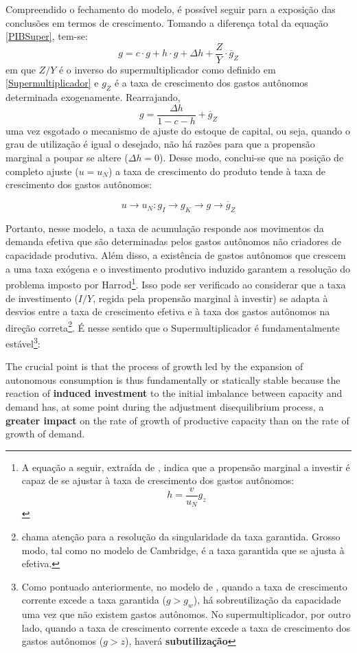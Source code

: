 Compreendido o fechamento do modelo, é possível seguir para a exposição das conclusões em termos de crescimento. Tomando a diferença total da equação \ref{PIBSuper}, tem-se:
$$
g = c\cdot g + h\cdot g + \Delta h + \frac{Z}{Y}\cdot \overline g_Z
$$
em que $Z/Y$ é o inverso do supermultiplicador como definido em \ref{Supermultiplicador} e $g_Z$ é a taxa de crescimento dos gastos autônomos determinada exogenamente. Rearrajando, 
\begin{equation}
\label{crescimentosuper}
g = \frac{\Delta h}{1 - c - h} + \overline g_Z
\end{equation}
uma vez esgotado o mecanismo de ajuste do estoque de capital, ou seja, quando o grau de utilização é igual o desejado, não há razões para que a propensão marginal a poupar se altere ($\Delta h = 0$). Desse modo, conclui-se que na posição de completo ajuste ($u = u_N$) a taxa de crescimento do produto tende à taxa de crescimento dos gastos autônomos:

$$
u \to u_N : g_I \to g_K \to g \to \overline g_Z
$$

Portanto, nesse modelo, a taxa de acumulação responde aos movimentos da demanda efetiva que são determinadas pelos gastos autônomos não criadores de capacidade produtiva. Além disso, a existência de gastos autônomos que crescem a uma taxa exógena e o investimento produtivo induzido garantem a resolução do problema imposto por Harrod\footnote{A equação a seguir, extraída de \textcite{serrano_sraffian_2017}, indica que a propensão marginal a investir é capaz de se ajustar à taxa de crescimento dos gastos autônomos:
$$
h = \frac{v}{u_N}g_z
$$
}. Isso pode ser verificado ao considerar que a taxa de investimento ($I/Y$, regida pela propensão marginal à investir) se adapta à desvios entre a taxa de crescimento efetiva e à taxa dos gastos autônomos na direção correta\footnote{\textcite{cesaratto_neo-kaleckian_2015} chama atenção para a resolução da singularidade da taxa garantida. Grosso modo, tal como no modelo de Cambridge, é a taxa garantida que se ajusta à efetiva.}. 
É nesse sentido que o Supermultiplicador é fundamentalmente estável\footnote{
Como pontuado anteriormente, no modelo de \textcite{harrod_essay_1939}, quando a taxa de crescimento corrente excede a taxa garantida ($g > g_w$), há sobreutilização da capacidade uma vez que não existem gastos autônomos. No supermultiplicador, por outro lado, quando a taxa de crescimento corrente excede a taxa de crescimento dos gastos autônomos ($g > z$), haverá \textbf{subutilização}}:

\begin{citacao}
The crucial point is that the process of growth led by the expansion of autonomous consumption is thus fundamentally or statically stable because the reaction of \textbf{induced investment} to the initial imbalance between capacity and demand has, at some point during the adjustment disequilibrium process, a \textbf{greater impact} on the rate of growth of productive capacity than on the rate of growth of demand. \cite[p.~19, grifos adicionados]{serrano_trouble_2017}
\end{citacao}

